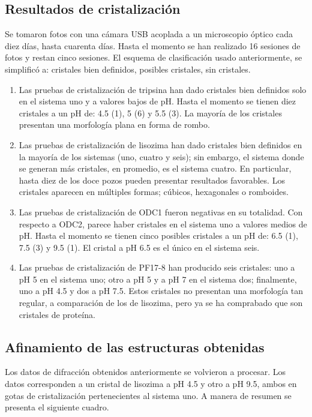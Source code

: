 \documentclass[11pt,letterpaper]{article}
\begin{document}
\subsection{Resultados de cristalización}
Se tomaron fotos con una cámara USB acoplada a un microscopio óptico cada diez días, hasta cuarenta días. Hasta el momento se han realizado 16 sesiones de fotos y restan cinco sesiones. El esquema de clasificación usado anteriormente, se simplificó a: cristales bien definidos, posibles cristales, sin cristales.
\begin{enumerate}
	\item Las pruebas de cristalización de tripsina han dado cristales bien definidos solo en el sistema uno y a valores bajos de pH. Hasta el momento se tienen diez cristales a un pH de: 4.5 (1), 5 (6) y 5.5 (3). La mayoría de los cristales presentan una morfología plana en forma de rombo.
	\item Las pruebas de cristalización de lisozima han dado cristales bien definidos en la mayoría de los sistemas (uno, cuatro y seis); sin embargo, el sistema donde se generan más cristales, en promedio, es el sistema cuatro. En particular, hasta diez de los doce pozos pueden presentar resultados favorables. Los cristales aparecen en múltiples formas; cúbicos, hexagonales o romboides.  
	\item Las pruebas de cristalización de ODC1 fueron negativas en su totalidad. Con respecto a ODC2, parece haber cristales en el sistema uno a valores medios de pH. Hasta el momento se tienen cinco posibles cristales a un pH de: \num{6.5} (\num{1}), \num{7.5} (\num{3}) y \num{9.5} (\num{1}). El cristal a pH 6.5 es el único en el sistema seis.
	\item Las pruebas de cristalización de PF17-8 han producido seis cristales: uno a pH \num{5} en el sistema uno; otro a pH \num{5} y a pH \num{7} en el sistema dos; finalmente, uno a pH \num{4.5} y dos a pH \num{7.5}. Estos cristales no presentan una morfología tan regular, a comparación de los de lisozima, pero ya se ha comprabado que son cristales de proteína.
\end{enumerate}

\subsection{Afinamiento de las estructuras obtenidas}
Los datos de difracción obtenidos anteriormente se volvieron a procesar. Los datos corresponden a un cristal de lisozima a pH \num{4.5} y otro a pH \num{9.5}, ambos en gotas de cristalización pertenecientes al sistema uno. A manera de resumen se presenta el siguiente cuadro.
\end{document}

